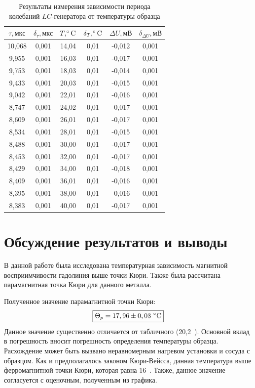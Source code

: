 \documentclass[a4paper, 12pt]{article}
\begin{document}
\begin{table}[h!]
\begin{center}
\begin{tabular}{|c|c|c|c|c|c|}
\hline
$\tau, мкс$ & $\delta_{\tau}, мкс$ & $T, \celsius$ & $\delta_T, \celsius$ & $\Delta{U}, мВ$ & $\delta_{\Delta{U}}, мВ$ \\ \hline
10,068 & 0,001 & 14,04 & 0,01 & -0,012 & 0,001 \\ \hline
9,955 & 0,001 & 16,03 & 0,01 & -0,017 & 0,001 \\ \hline
9,753 & 0,001 & 18,03 & 0,01 & -0,014 & 0,001 \\ \hline
9,433 & 0,001 & 20,03 & 0,01 & -0,015 & 0,001 \\ \hline
9,042 & 0,001 & 22,01 & 0,01 & -0,016 & 0,001 \\ \hline
8,747 & 0,001 & 24,02 & 0,01 & -0,017 & 0,001 \\ \hline
8,609 & 0,001 & 26,01 & 0,01 & -0,017 & 0,001 \\ \hline
8,534 & 0,001 & 28,01 & 0,01 & -0,015 & 0,001 \\ \hline
8,488 & 0,001 & 30,00 & 0,01 & -0,017 & 0,001 \\ \hline
8,453 & 0,001 & 32,00 & 0,01 & -0,017 & 0,001 \\ \hline
8,429 & 0,001 & 34,00 & 0,01 & -0,018 & 0,001 \\ \hline
8,409 & 0,001 & 36,01 & 0,01 & -0,016 & 0,001 \\ \hline
8,395 & 0,001 & 38,00 & 0,01 & -0,016 & 0,001 \\ \hline
8,383 & 0,001 & 40,00 & 0,01 & -0,017 & 0,001 \\ \hline
\end{tabular}
\end{center}
\caption{Результаты измерения зависимости периода колебаний $LC$-генератора от температуры образца}
\label{tab1}
\end{table}


\section{Обсуждение результатов и выводы}

В данной работе была исследована температурная зависимость магнитной восприимчивости гадолиния выше точки Кюри. Также была рассчитана парамагнитная точка Кюри для данного металла.

Полученное значение парамагнитной точки Кюри: $$\boxed{\Theta_p = 17,96\pm0,03~\celsius}$$
Данное значение существенно отличается от табличного (20,2~\textcelsius). Основной вклад в погрешность вносит погрешность определения температуры образца. Расхождение может быть вызвано неравномерным нагревом установки и сосуда с образцом. Как и предполагалось законом Кюри-Вейсса, данная температура выше ферромагнитной точки Кюри, которая равна 16~\textcelsius{}. Также, данное значение согласуется с оценочным, полученным из графика.
\end{document}
